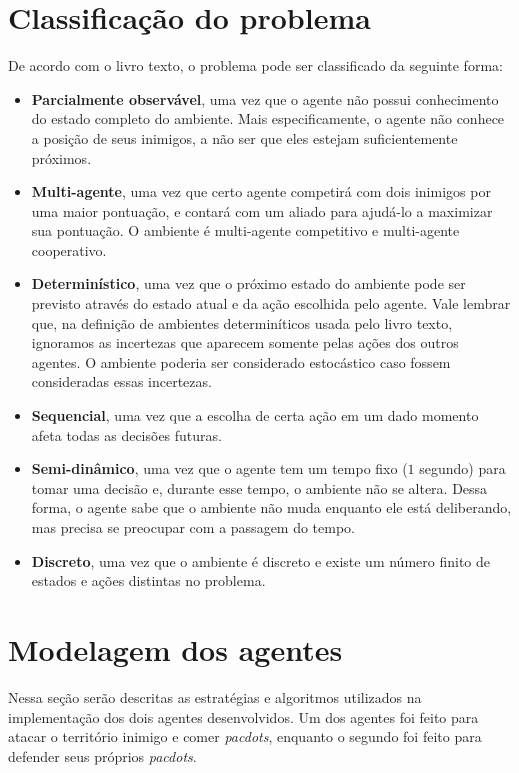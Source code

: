 \documentclass[a4paper,12pt]{article}
\begin{document}
\section{Classificação do problema}
De acordo com o livro texto, o problema pode ser classificado da seguinte forma:

\begin{itemize}
  \item \textbf{Parcialmente observável}, uma vez que o agente não possui conhecimento
  do estado completo do ambiente. Mais especificamente, o agente não conhece a posição
  de seus inimigos, a não ser que eles estejam suficientemente próximos.
  \item \textbf{Multi-agente}, uma vez que certo agente competirá com dois inimigos
  por uma maior pontuação, e contará com um aliado para ajudá-lo a maximizar sua
  pontuação. O ambiente é multi-agente competitivo e multi-agente cooperativo.
  \item \textbf{Determinístico}, uma vez que o próximo estado do ambiente pode ser
  previsto através do estado atual e da ação escolhida pelo agente. Vale lembrar que,
  na definição de ambientes determiníticos usada pelo livro texto, ignoramos as
  incertezas que aparecem somente pelas ações dos outros agentes. O ambiente poderia
  ser considerado estocástico caso fossem consideradas essas incertezas.
  \item \textbf{Sequencial}, uma vez que a escolha de certa ação em um dado momento
  afeta todas as decisões futuras.
  \item \textbf{Semi-dinâmico}, uma vez que o agente tem um tempo fixo ($1$ segundo)
  para tomar uma decisão e, durante esse tempo, o ambiente não se altera. Dessa forma,
  o agente sabe que o ambiente não muda enquanto ele está deliberando, mas precisa se
  preocupar com a passagem do tempo.
  \item \textbf{Discreto}, uma vez que o ambiente é discreto e existe um número
  finito de estados e ações distintas no problema.
\end{itemize}

\section{Modelagem dos agentes}
Nessa seção serão descritas as estratégias e algoritmos utilizados na implementação dos
dois agentes desenvolvidos. Um dos agentes foi feito para atacar o território inimigo
e comer \textit{pacdots}, enquanto o segundo foi feito para defender seus próprios
\textit{pacdots}.
\end{document}
